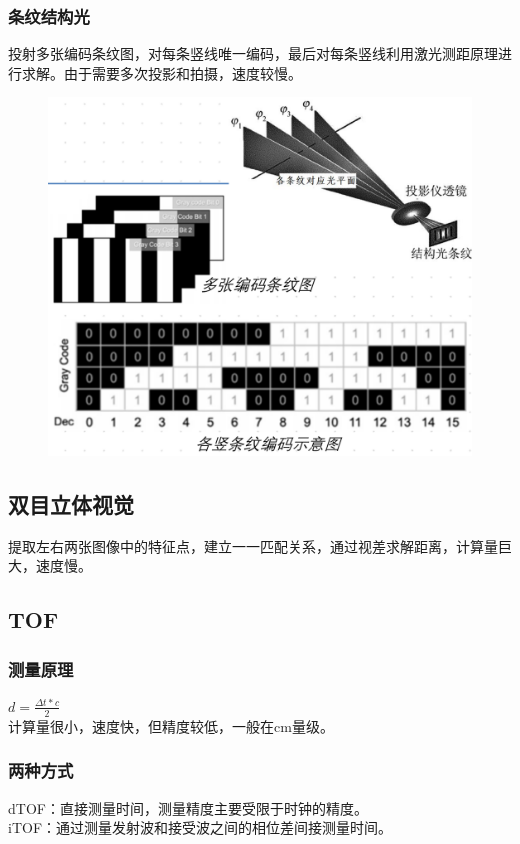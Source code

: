 \documentclass[11pt]{article}
\begin{document}
\subsubsection{条纹结构光}
投射多张编码条纹图，对每条竖线唯一编码，最后对每条竖线利用激光测距原理进行求解。由于需要多次投影和拍摄，速度较慢。
\begin{figure}[htb]
    \centering
    \includegraphics[scale=0.1]{imgs/tiaowen.png}
\end{figure}

\subsection{双目立体视觉}
提取左右两张图像中的特征点，建立一一匹配关系，通过视差求解距离，计算量巨大，速度慢。

\subsection{TOF}

\subsubsection{测量原理}
$d = \frac{\Delta t * c}{2}$  \\
计算量很小，速度快，但精度较低，一般在cm量级。

\subsubsection{两种方式}
dTOF：直接测量时间，测量精度主要受限于时钟的精度。  \\
iTOF：通过测量发射波和接受波之间的相位差间接测量时间。
\end{document}
